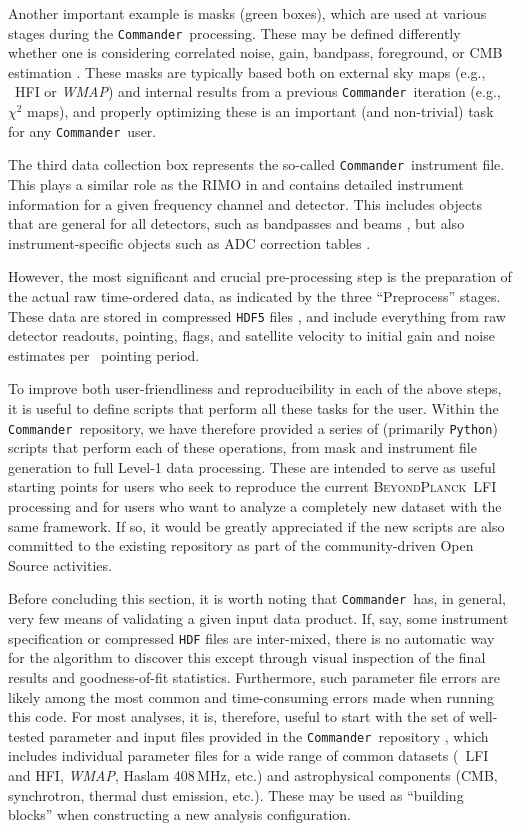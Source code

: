\documentclass[twocolumn]{aa}
\def\WMAP{\textit{WMAP}}
\def\commander{\texttt{Commander}}
\newcommand{\BP}{\textsc{BeyondPlanck}}
\begin{document}
Another important example is masks (green boxes), which are used at various stages during the \commander\ processing. These may be defined differently whether one is considering correlated noise, gain, bandpass, foreground, or CMB estimation \citep[e.g.,][]{bp06,bp07,bp11,bp12,BP13,bp14}. These masks are typically based both on external sky maps (e.g., \Planck\ HFI or \WMAP) and internal results from a previous \commander\ iteration (e.g., $\chi^2$ maps), and properly optimizing these is an important (and non-trivial) task for any \commander\ user.

The third data collection box represents the so-called \commander\ instrument file. This plays a similar role as the RIMO in \Planck and contains detailed instrument information for a given frequency channel and detector. This includes objects that are general for all detectors, such as bandpasses and beams \citep{bp08,bp09}, but also instrument-specific objects such as ADC correction tables \citep{bp25}.

However, the most significant and crucial pre-processing step is the preparation of the actual raw time-ordered data, as indicated by the three ``Preprocess'' stages. These data are stored in compressed \texttt{HDF5} files \citep{BP03}, and include everything from raw detector readouts, pointing, flags, and satellite velocity to initial gain and noise estimates per \Planck\ pointing period.

To improve both user-friendliness and reproducibility in each of the above steps, it is useful to define scripts that perform all these tasks for the user. Within the \commander\ repository, we have therefore provided a series of (primarily \texttt{Python}) scripts that perform each of these operations, from mask and instrument file generation to full Level-1 data processing. These are intended to serve as useful starting points for users who seek to reproduce the current \BP\ LFI processing and for users who want to analyze a completely new dataset with the same framework. If so, it would be greatly appreciated if the new scripts are also committed to the existing repository as part of the community-driven Open Source activities.

Before concluding this section, it is worth noting that \commander\ has, in general, very few means of validating a given input data product. If, say, some instrument specification or compressed \texttt{HDF} files are inter-mixed, there is no automatic way for the algorithm to discover this except through visual inspection of the final results and goodness-of-fit statistics. Furthermore, such parameter file errors are likely among the most common and time-consuming errors made when running this code. For most analyses, it is, therefore, useful to start with the set of well-tested parameter and input files provided in the \commander\ repository \citep{BP03}, which includes individual parameter files for a wide range of common datasets (\Planck\ LFI and HFI, \WMAP, Haslam 408\,MHz, etc.) and astrophysical components (CMB, synchrotron, thermal dust emission, etc.). These may be used as ``building blocks'' when constructing a new analysis configuration.
\end{document}
